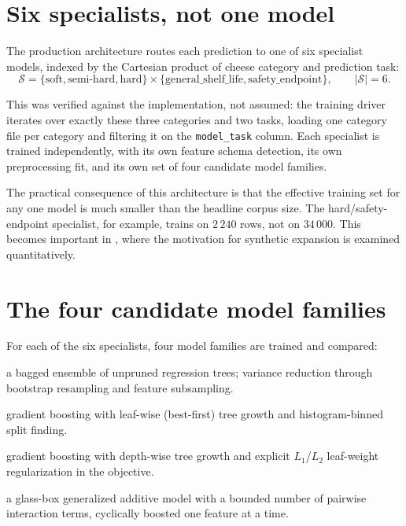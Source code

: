 \section{Six specialists, not one model}

The production architecture routes each prediction to one of six
specialist models, indexed by the Cartesian product of cheese category and
prediction task:
\begin{equation}
\mathcal{S} = \{\text{soft}, \text{semi-hard}, \text{hard}\}
\times
\{\text{general\_shelf\_life}, \text{safety\_endpoint}\},
\qquad |\mathcal{S}| = 6 .
\end{equation}

This was verified against the implementation, not assumed: the training
driver  iterates over exactly these three
categories and two tasks, loading one category file per category and
filtering it on the \texttt{model\_task} column. Each specialist is trained
independently, with its own feature schema detection, its own preprocessing
fit, and its own set of four candidate model families.


The practical consequence of this architecture is that the effective
training set for any one model is much smaller than the headline corpus
size. The hard/safety-endpoint specialist, for example, trains on
$2\,240$ rows, not on $34\,000$. This becomes important in
, where the motivation for synthetic expansion is
examined quantitatively.

\section{The four candidate model families}

For each of the six specialists, four model families are trained and
compared:

\begin{description}[leftmargin=1.6em, style=nextline, font=\bfseries\color{dgreen}]
\item[Random Forest] a bagged ensemble of unpruned regression trees;
  variance reduction through bootstrap resampling and feature subsampling.
\item[LightGBM] gradient boosting with leaf-wise (best-first) tree growth
  and histogram-binned split finding.
\item[XGBoost] gradient boosting with depth-wise tree growth and explicit
  $L_1$/$L_2$ leaf-weight regularization in the objective.
\item[Explainable Boosting Machine (EBM)] a glass-box generalized additive
  model with a bounded number of pairwise interaction terms, cyclically
  boosted one feature at a time.
\end{description}

